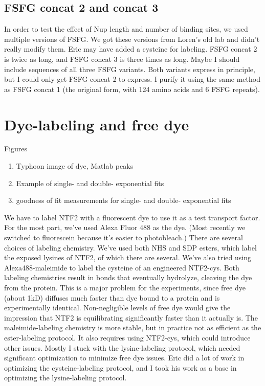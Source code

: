 
\subsection{FSFG concat 2 and concat 3}
In order to test the effect of Nup length and number of binding sites, we used multiple versions of FSFG.  We got these versions from Loren's old lab and didn't really modify them.  Eric may have added a cysteine for labeling.  FSFG concat 2 is twice as long, and FSFG concat 3 is three times as long.  Maybe I should include sequences of all three FSFG variants.  Both variants express in principle, but I could only get FSFG concat 2 to express.  I purify it using the same method as FSFG concat 1 (the original form, with 124 amino acids and 6 FSFG repeats).  

\section{Dye-labeling and free dye}
Figures
\begin{enumerate}
\item Typhoon image of dye, Matlab peaks
\item Example of single- and double- exponential fits
\item goodness of fit measurements for single- and double- exponential fits
\end{enumerate}
We have to label NTF2 with a fluorescent dye to use it as a test transport factor.  For the most part, we've used Alexa Fluor 488 as the dye.  (Most recently we switched to fluorescein because it's easier to photobleach.)  There are several choices of labeling chemistry.  We've used both NHS and SDP esters, which label the exposed lysines of NTF2, of which there are several.  We've also tried using Alexa488-maleimide to label the cysteine of an engineered NTF2-cys.  Both labeling chemistries result in bonds that eventually hydrolyze, cleaving the dye from the protein.  This is a major problem for the experiments, since free dye (about 1kD) diffuses much faster than dye bound to a protein and is experimentally identical.  Non-negligible levels of free dye would give the impression that NTF2 is equilibrating significantly faster than it actually is.  The maleimide-labeling chemistry is more stable, but in practice not as efficient as the ester-labeling protocol.  It also requires using NTF2-cys, which could introduce other issues.  Mostly I stuck with the lysine-labeling protocol, which needed significant optimization to minimize free dye issues.  Eric did a lot of work in optimizing the cysteine-labeling protocol, and I took his work as a base in optimizing the lysine-labeling protocol.


